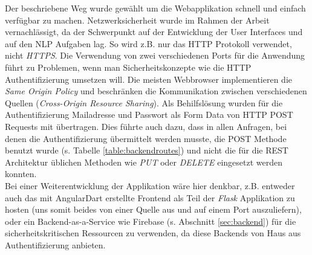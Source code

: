 Der beschriebene Weg wurde gewählt um die Webapplikation schnell und einfach verfügbar zu machen. Netzwerksicherheit wurde im Rahmen der Arbeit vernachlässigt, da der Schwerpunkt auf der Entwicklung der User Interfaces und auf den NLP Aufgaben lag. So wird z.B. nur das HTTP Protokoll verwendet, nicht \textit{HTTPS}. Die Verwendung von zwei verschiedenen Ports für die Anwendung führt zu Problemen, wenn man Sicherheitskonzepte wie die HTTP Authentifizierung umsetzen will. Die meisten Webbrowser implementieren die \textit{Same Origin Policy} und beschränken die Kommunikation zwischen verschiedenen Quellen (\textit{Cross-Origin Resource Sharing}\cite{kesteren2010}). Als Behilfslösung wurden für die Authentifizierung Mailadresse und Passwort als Form Data von HTTP POST Requests mit übertragen. Dies führte auch dazu, dass in allen Anfragen, bei denen die Authentifizierung übermittelt werden musste, die POST Methode benutzt wurde (s. Tabelle \ref{table:backendroutes}) und nicht die für die REST Architektur üblichen Methoden wie \textit{PUT} oder \textit{DELETE} eingesetzt werden konnten.\\
Bei einer Weiterentwicklung der Applikation wäre hier denkbar, z.B. entweder auch das mit AngularDart erstellte Frontend als Teil der \textit{Flask} Applikation zu hosten (uns somit beides von einer Quelle aus und auf einem Port auszuliefern), oder ein Backend-as-a-Service wie Firebase (s. Abschnitt \ref{sec:backend}) für die sicherheitskritischen Ressourcen zu verwenden, da diese Backends von Haus aus Authentifizierung anbieten.